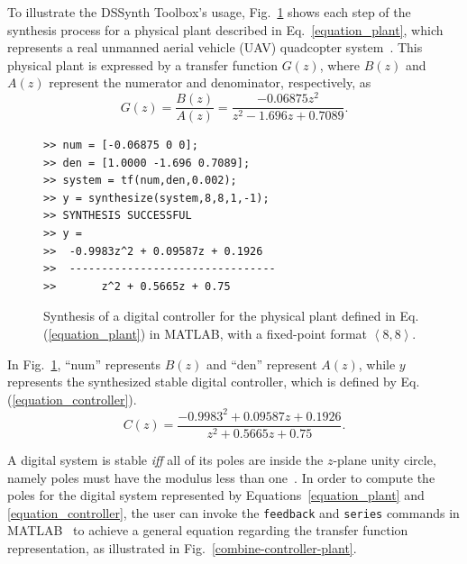 \documentclass[10pt,conference]{IEEEtran}
\newcommand\tool{{DSSynth Toolbox}\xspace}
\begin{document}
To illustrate the \tool's usage, Fig.~\ref{toolbox-usage} shows each step of the 
synthesis process for a physical plant described in Eq.~\eqref{equation_plant},
which represents a real unmanned aerial vehicle (UAV) quadcopter system~\cite{bouabdallah}. 
This physical plant is expressed by a transfer function $G(z)$, where 
$B(z)$ and $A(z)$ represent the numerator and denominator, respectively, as
%
\begin{equation}
\label{equation_plant}
G(z)=\frac{B(z)}{A(z)}=\frac{-0.06875z^{2}}{z^2-1.696z+0.7089}.
\end{equation}

\begin{figure}[ht]
\scriptsize
\begin{lstlisting}[xleftmargin=.025\textwidth,xrightmargin=.025\textwidth, frame=single,]
>> num = [-0.06875 0 0];
>> den = [1.0000 -1.696 0.7089];
>> system = tf(num,den,0.002);
>> y = synthesize(system,8,8,1,-1);
>> SYNTHESIS SUCCESSFUL
>> y = 
>>  -0.9983z^2 + 0.09587z + 0.1926
>>  --------------------------------
>>       z^2 + 0.5665z + 0.75
\end{lstlisting}
\vspace{-0.2cm}
\caption{Synthesis of a digital controller for the physical plant defined in Eq.(\ref{equation_plant}) in MATLAB, with a fixed-point format  $\left\langle 8,8\right\rangle$.}
\label{toolbox-usage}
\end{figure}

In Fig.~\ref{toolbox-usage}, ``num'' represents $B(z)$ and ``den'' represent $A(z)$, while 
$y$ represents the synthesized stable digital controller, which is defined by Eq.(\ref{equation_controller}).
%
\begin{equation}
\label{equation_controller}
C(z)=\frac{-0.9983^{2}+0.09587z+0.1926}{z^2+0.5665z+0.75}.
\end{equation}

A digital system is stable \textit{iff} all of its poles are inside the $z$-plane unity circle, 
namely poles must have the modulus less than one~\cite{astrom1997computer}. In order to compute the poles for the digital 
system represented by Equations~\eqref{equation_plant} and \eqref{equation_controller}, 
the user can invoke the \texttt{feedback} and \texttt{series} commands in MATLAB~\cite{matlab-toolbox} 
to achieve a general equation regarding the transfer function representation, as illustrated in Fig.~\ref{combine-controller-plant}. 
\end{document}
